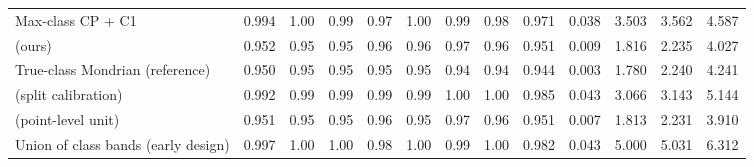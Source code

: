 \begin{table}[!htbp]
{\begin{tabular}{lcccccccccccc}
Max-class CP + C1 & 0.994 & 1.00 & 0.99 & 0.97 & 1.00 & 0.99 & 0.98 & 0.971 & 0.038 & 3.503 & 3.562 & 4.587 \\
\gamut{} (ours) & 0.952 & 0.95 & 0.95 & 0.96 & 0.96 & 0.97 & 0.96 & 0.951 & 0.009 & 1.816 & 2.235 & 4.027 \\
True-class Mondrian (reference) & 0.950 & 0.95 & 0.95 & 0.95 & 0.95 & 0.94 & 0.94 & 0.944 & 0.003 & 1.780 & 2.240 & 4.241 \\
\gamut{} (split calibration) & 0.992 & 0.99 & 0.99 & 0.99 & 0.99 & 1.00 & 1.00 & 0.985 & 0.043 & 3.066 & 3.143 & 5.144 \\
\gamut{} (point-level unit) & 0.951 & 0.95 & 0.95 & 0.96 & 0.95 & 0.97 & 0.96 & 0.951 & 0.007 & 1.813 & 2.231 & 3.910 \\
Union of class bands (early design) & 0.997 & 1.00 & 1.00 & 0.98 & 1.00 & 0.99 & 1.00 & 0.982 & 0.043 & 5.000 & 5.031 & 6.312 \\
\bottomrule
\end{tabular}}
\end{table}

